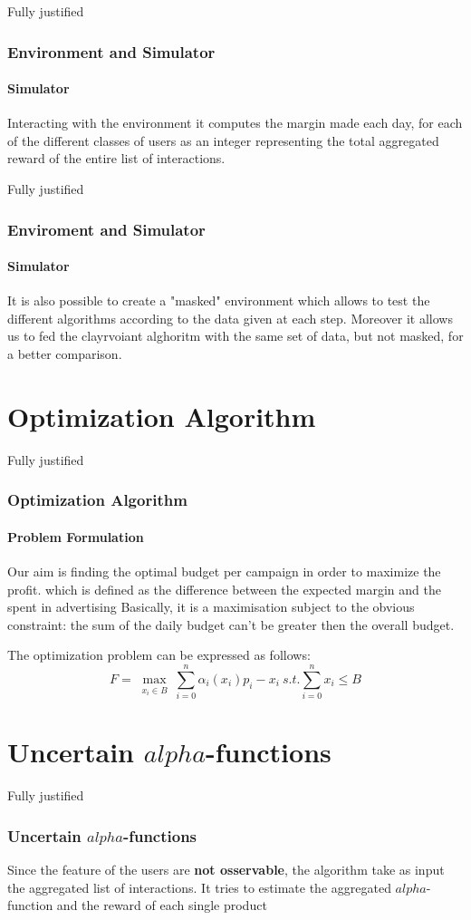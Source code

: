 \documentclass{beamer}
\begin{document}
\begin {frame}{Fully justified}
\frametitle{Environment and Simulator}
\framesubtitle{Simulator}
Interacting with the environment it computes the margin made each day, for each of the different classes of users as an integer representing the total aggregated reward of the entire list of interactions.
\end{frame}

\begin {frame}{Fully justified}
\frametitle{Enviroment and Simulator}
\framesubtitle{Simulator}
It is also possible to create a "masked" environment which allows to test the different algorithms according to the data given at each step. Moreover it allows us to fed the clayrvoiant alghoritm with the same set of data, but not masked, for a better comparison.

\end{frame}


\section{Optimization Algorithm}

\AtBeginSection[ ]
{
    \begin{frame}{}
    \tableofcontents[currentsection]
\end{frame}
}

\begin {frame}{Fully justified}
\frametitle{Optimization Algorithm}
\framesubtitle{Problem Formulation}
Our aim is finding the optimal budget per campaign in order to maximize the profit.
which is defined as the difference between the expected margin and the spent in advertising 
Basically, it is a maximisation subject to the obvious constraint: the sum of the daily budget can't be greater then the overall budget.

The optimization problem can be expressed as follows:
\begin{displaymath}
F=\max_{\substack{x_i\in B}} \sum_{i=0}^n \alpha_i(x_i)p_i-x_i \ s.t. \sum_{i=0}^n x_i\leq B  
\end{displaymath}
\end{frame}



\AtBeginSection[ ]
{
    \begin{frame}{}
    \tableofcontents[currentsection]
\end{frame}
}

\section{Uncertain $alpha$-functions}
\begin {frame}{Fully justified}
\frametitle{Uncertain $alpha$-functions}
Since the feature of the users are \textbf{not osservable}, the algorithm take as input the aggregated list of interactions.  
It tries to estimate the aggregated $alpha$-function and the reward of each single product 
\end{frame}
\end{document}

